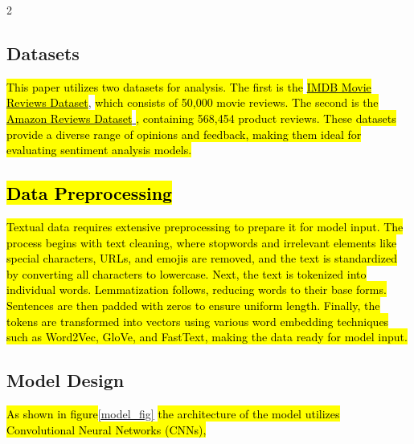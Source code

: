 \documentclass[10pt,a4paper]{article}
\begin{document}
\begin{multicols}{2}
\subsection*{Datasets}
\hl{This paper utilizes two datasets for analysis. The first is the }\href{https://www.kaggle.com/datasets/lakshmi25npathi/imdb-dataset-of-50k-movie-reviews}{\hl{IMDB Movie Reviews Dataset}}\cite{N_2019}, \hl{which consists of 50,000 movie reviews. The second is the} \href{https://www.kaggle.com/datasets/snap/amazon-fine-food-reviews}{\hl{Amazon Reviews Dataset} }\cite{Project_2017}\hl{, containing 568,454 product reviews. These datasets provide a diverse range of opinions and feedback, making them ideal for evaluating sentiment analysis models.}

\subsection*{\hl{Data Preprocessing}}
\hl{Textual data requires extensive preprocessing to prepare it for model input. The process begins with text cleaning, where stopwords and irrelevant elements like special characters, URLs, and emojis are removed, and the text is standardized by converting all characters to lowercase. Next, the text is tokenized into individual words. Lemmatization follows, reducing words to their base forms. Sentences are then padded with zeros to ensure uniform length. Finally, the tokens are transformed into vectors using various word embedding techniques such as Word2Vec, GloVe, and FastText, making the data ready for model input.}
%
%



\subsection*{Model Design}
\hl{As shown in figure}\ref{model_fig} \hl{the architecture of the model utilizes Convolutional Neural Networks (CNNs), } 
\end{multicols}
\end{document}
